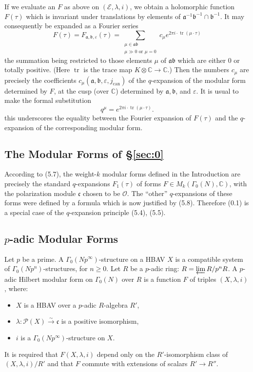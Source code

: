 \documentclass[12pt,a4paper]{article}
\theoremstyle{plain}
\theoremstyle{definition}
\theoremstyle{remark}
\DeclareMathOperator{\tr}{tr}
\begin{document}
If we evaluate an $F$ as above on $(\mathcal{E}, \lambda, i)$, we obtain a holomorphic function $F(\tau)$ which is invariant under translations by elements of $\mathfrak{a}^{-1}\mathfrak{b}^{-1} \cap \mathfrak{b}^{-1}$. It may consequently be expanded as a Fourier series
\[
F(\tau) = F_{\mathfrak{a},\mathfrak{b},\varepsilon}(\tau) = \sum_{\substack{\mu \in \mathfrak{a}\mathfrak{b} \\ \mu \gg 0 \text{ or } \mu = 0}} c_\mu e^{2\pi i \cdot \tr(\mu \cdot \tau)}
\]
the summation being restricted to those elements $\mu$ of $\mathfrak{a}\mathfrak{b}$ which are either $0$ or totally positive. (Here $\tr$ is the trace map $K \otimes \mathbb{C} \to \mathbb{C}$.) Then the numbers $c_\mu$ are precisely the coefficients $c_\mu(\mathfrak{a}, \mathfrak{b}, \varepsilon, j_{\mathrm{can}})$ of the $q$-expansion of the modular form determined by $F$, at the cusp (over $\mathbb{C}$) determined by $\mathfrak{a}, \mathfrak{b}$, and $\varepsilon$. It is usual to make the formal substitution
\[
q^\mu = e^{2\pi i \cdot \tr(\mu \cdot \tau)}.
\]
this underscores the equality between the Fourier expansion of $F(\tau)$ and the $q$-expansion of the corresponding modular form.

\subsection*{The Modular Forms of \S\ref{sec:0}}

According to (5.7), the weight-$k$ modular forms defined in the Introduction are precisely the standard $q$-expansions $F_1(\tau)$ of forms $F \in M_k(\Gamma_0(N), \mathbb{C})$, with the polarization module $\mathfrak{c}$ chosen to be $\mathcal{O}$. The ``other'' $q$-expansions of these forms were defined by a formula which is now justified by (5.8). Therefore (0.1) is a special case of the $q$-expansion principle (5.4), (5.5).

\subsection*{$p$-adic Modular Forms}

Let $p$ be a prime. A $\Gamma_0(Np^\infty)$-structure on a HBAV $X$ is a compatible system of $\Gamma_0(Np^n)$-structures, for $n \ge 0$. Let $R$ be a $p$-adic ring: $R = \varprojlim R/p^nR$. A $p$-adic Hilbert modular form on $\Gamma_0(N)$ over $R$ is a function $F$ of triples $(X, \lambda, i)$, where:
\begin{itemize}
\item $X$ is a HBAV over a $p$-adic $R$-algebra $R'$,
\item $\lambda: \mathscr{P}(X) \xrightarrow{\sim} \mathfrak{c}$ is a positive isomorphism,
\item $i$ is a $\Gamma_0(Np^\infty)$-structure on $X$.
\end{itemize}
It is required that $F(X, \lambda, i)$ depend only on the $R'$-isomorphism class of $(X, \lambda, i)/R'$ and that $F$ commute with extensions of scalars $R' \to R''$.
\end{document}
